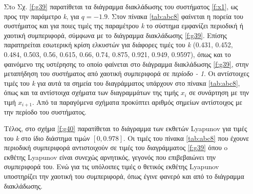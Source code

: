 Στo Σχ. \ref{f:g39} παρατίθεται τα διάγραμμα διακλάδωσης του συστήματος \ref{f:x1}, ως προς την παράμετρο \emph{k}, για $q =- 1.9$. 
Στον πίνακα \ref{tab:abc8} φαίνεται η πορεία του συστήματος και για ποιες τιμές της παραμέτρου \emph{k} το σύστημα εμφανίζει περιοδική ή χαοτική συμπεριφορά, σύμφωνα με το διάγραμμα διακλάδωσης \ref{f:g39}. Επίσης παρατηρείται εσωτερική κρίση ελκυστών για διάφορες τιμές του \emph{k} (0.431, 0.452, 0.484, 0.503, 0.56, 0.615, 0.66, 0.74, 0.875, 0.921, 0.949, 0.9597), όπως και το φαινόμενο της υστέρησης το οποίο φαίνεται στο διάγραμμα διακλάδωσης \ref{f:g39}, στην μεταπήδηση του συστήματος από χαοτική συμπεριφορά σε \emph{περίοδο - 1}. Οι αντίστοιχες τιμές του \emph{k} για αυτά τα σημεία του διαγράμματος υπάρχουν στο πίνακα \ref{tab:abc8}, όπως και τα αντίστοιχα σχήματα των διαγραμμάτων της τιμής \(x_i\) σε συνάρτηση με την τιμή \(x_{i+1}\). Από τα παραγόμενα σχήματα προκύπτει αριθμός σημείων αντίστοιχος με την περίοδο του συστήματος.

Τέλος, στο σχήμα \ref{f:g40} παρατίθεται το διάγραμμα των εκθετών Lyapunov για τιμές του \emph{k} στο ίδιο διάστημα τιμών $[0, 0.978]$. Οι τιμές του πίνακα \ref{tab:abc8} που έχουνε περιοδική συμπεριφορά αντιστοιχούν σε τιμές του διαγράμματος \ref{f:g39} όπου o εκθέτης Lyapunov είναι συνεχώς αρνητικός, γεγονός που επιβεβαιώνει την συμπεριφορά του. Ενώ για τις υπόλοιπες τιμές ο θετικός εκθέτης Lyapunov υποστηρίζει την χαοτική του συμπεριφορά, όπως έγινε φανερό και από το διάγραμμα διακλάδωσης.\\\\


